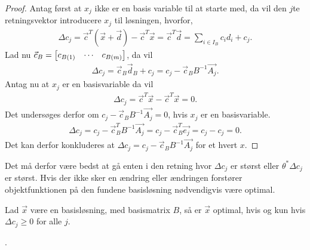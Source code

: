 \begin{proof}
Antag først at $x_j$ ikke er en basis variable til at starte med, da vil den $j$te retningsvektor introducere $x_j$ til løsningen, hvorfor,
\begin{align*}
\Delta c_j = \vec{c}^T(\vec{x}+ \vec{d}) - \vec{c}^T\vec{x} = \vec{c}^T\vec{d} = \sum_{i \in I_B} c_i d_i + c_j.
\end{align*}
Lad nu $\vec{c}_B = \begin{bmatrix} c_{B(1)}& \cdots & c_{B(m)} \end{bmatrix}$, da vil
\begin{align}
\Delta c_j =\vec{c}_B\vec{d}_B+ c_j = c_j-\vec{c}_B B^{-1}\vec{A_j}.
\end{align}
Antag nu at $x_j$ er en basisvariable da vil 
\begin{align*}
\Delta c_j = \vec{c}^T\vec{x}- \vec{c}^T\vec{x} = 0.
\end{align*}
Det undersøges derfor om $ c_j-\vec{c}_B B^{-1}\vec{A_j}= 0$, hvis $x_j$ er en basisvariable.
\begin{align*}
 \Delta c_j = c_j-\vec{c}_B^T B^{-1}\vec{A_j} = c_j - \vec{c}_B^T \vec{e_j} = c_j - c_j = 0.
\end{align*}
Det kan derfor konkluderes at $\Delta c_j = c_j-\vec{c}_B B^{-1}\vec{A_j}$ for et hvert $x$.
\end{proof}
Det må derfor være bedst at gå enten i den retning hvor $\Delta c_j$ er størst eller $\theta^*\Delta c_j$ er størst. 
Hvis der ikke sker en ændring eller ændringen forstører objektfunktionen på den fundene basisløsning nødvendigvis være optimal.
\begin{stn}
Lad $\vec{x}$ være en basisløsning, med basismatrix $B$, så er $\vec{x}$ optimal, hvis og kun hvis $\Delta c_j \geq 0$ for alle $j$.
\end{stn}.
